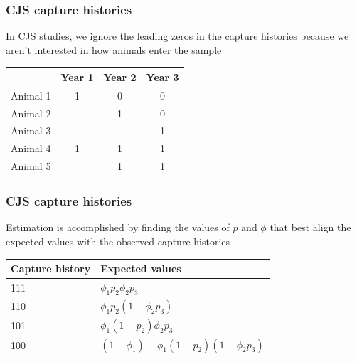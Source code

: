 \documentclass[color=usenames,dvipsnames]{beamer}\usepackage[]{graphicx}\usepackage[]{color}
\begin{document}



\begin{frame}
  \frametitle{CJS capture histories}
  In CJS studies, we ignore the leading zeros in the capture histories
  because we aren't interested in how animals enter the sample \\
  \vfill
  \vfill
  \begin{center}
    \small
    \begin{tabular}{lccc}
      \hline
      & Year 1 & Year 2 & Year 3 \\
      \hline
      Animal 1 & 1 & 0 & 0 \\
      Animal 2 &  & 1 & 0 \\
      Animal 3 &  &  & 1 \\
      Animal 4 & 1 & 1 & 1 \\
      Animal 5 &  & 1 & 1 \\
      \hline
    \end{tabular}
  \end{center}
\end{frame}



\begin{frame}
  \frametitle{CJS capture histories}
  \large
  Estimation is accomplished by finding the values of $p$ and $\phi$
  that best align the expected values with the observed capture
  histories \\
  \vfill
  \begin{center}
    \begin{tabular}{ll}
      \hline
      Capture history & Expected values \\
      \hline
      111 & $\phi_1p_2\phi_2p_3$ \\ %
      110 & $\phi_1p_2(1-\phi_2p_3)$ \\ %
      101 & $\phi_1(1-p_2)\phi_2p_3$ \\ %
      100 & $(1-\phi_1)+\phi_1(1-p_2)(1-\phi_2p_3)$ \\
      \hline
    \end{tabular}
  \end{center}
\end{frame}
\end{document}
